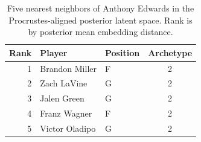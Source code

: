 \begin{table}[htbp]
  \centering\small
  \begin{tabular}{rllc}
    \toprule
    Rank & Player & Position & Archetype \\
    \midrule
    1 & Brandon Miller & F & 2 \\
    2 & Zach LaVine & G & 2 \\
    3 & Jalen Green & G & 2 \\
    4 & Franz Wagner & F & 2 \\
    5 & Victor Oladipo & G & 2 \\
    \bottomrule
  \end{tabular}
  \caption{Five nearest neighbors of Anthony Edwards in the Procrustes-aligned posterior latent space. Rank is by posterior mean embedding distance.}
  \label{tab:Anthony_Edwards_neighbors}
\end{table}

